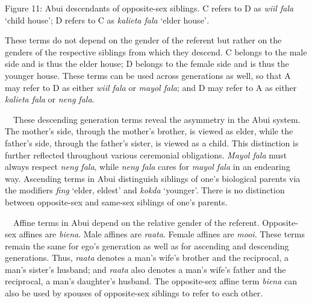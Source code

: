 {\centering
Figure 11: Abui descendants of opposite-sex siblings. C refers to D as \textit{wiil fala} {\textquoteleft}child house{\textquoteright}; D refers to C as \textit{kalieta fala }{\textquoteleft}elder house{\textquoteright}\textit{.}
\par}

{%
 \par}

These terms do not depend on the gender of the referent but rather on the genders of the respective siblings from which they descend. C belongs to the male side and is thus the elder house; D belongs to the female side and is thus the younger house. These terms can be used across generations as well, so that A may refer to D as either \textit{wiil fala }or \textit{mayol fala}; and D may refer to A as either \textit{kalieta fala }or \textit{neng fala}.

\ \ These descending generation terms reveal the asymmetry in the Abui system. The mother{\textquoteright}s side, through the mother{\textquoteright}s brother, is viewed as elder, while the father{\textquoteright}s side, through the father{\textquoteright}s sister, is viewed as a child. This distinction is further reflected throughout various ceremonial obligations. \textit{Mayol fala} must always respect \textit{neng fala}, while \textit{neng fala} cares for \textit{mayol fala} in an endearing way. Ascending terms in Abui distinguish siblings of one{\textquoteright}s biological parents via the modifiers \textit{fing }{\textquoteleft}elder, eldest{\textquoteright} and \textit{kokda }{\textquoteleft}younger{\textquoteright}. There is no distinction between opposite-sex and same-sex siblings of one{\textquoteright}s parents.

\ \ Affine terms in Abui depend on the relative gender of the referent. Opposite-sex affines are \textit{biena}. Male affines are \textit{raata}. Female affines are \textit{mooi}. These terms remain the same for ego{\textquoteright}s generation as well as for ascending and descending generations. Thus, \textit{raata }denotes a man{\textquoteright}s wife{\textquoteright}s brother and the reciprocal, a man{\textquoteright}s sister{\textquoteright}s husband; and \textit{raata }also denotes a man{\textquoteright}s wife{\textquoteright}s father and the reciprocal, a man{\textquoteright}s daughter{\textquoteright}s husband. The opposite-sex affine term \textit{biena} can also be used by spouses of opposite-sex siblings to refer to each other. 

